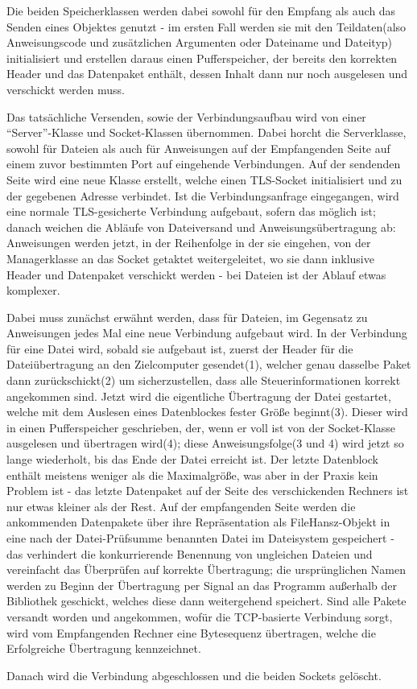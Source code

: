 Die beiden Speicherklassen werden dabei sowohl für den Empfang als auch das Senden eines Objektes genutzt - im ersten Fall werden sie mit den Teildaten(also Anweisungscode und zusätzlichen Argumenten oder Dateiname und Dateityp)
 initialisiert und erstellen daraus einen Pufferspeicher, der bereits den korrekten Header und das Datenpaket enthält, dessen Inhalt dann nur noch ausgelesen und verschickt werden muss.\par
Das tatsächliche Versenden, sowie der Verbindungsaufbau wird von einer "`Server"'-Klasse und Socket-Klassen übernommen.
Dabei horcht die Serverklasse, sowohl für Dateien als auch für Anweisungen auf der Empfangenden Seite auf einem zuvor bestimmten Port auf eingehende Verbindungen.
Auf der sendenden Seite wird eine neue Klasse erstellt, welche einen TLS-Socket initialisiert und zu der gegebenen Adresse verbindet.
Ist die Verbindungsanfrage eingegangen, wird eine normale TLS-gesicherte Verbindung aufgebaut, sofern das möglich ist; danach weichen die Abläufe von Dateiversand und Anweisungsübertragung ab: Anweisungen werden jetzt, in der Reihenfolge in der sie eingehen, von der Managerklasse an das Socket getaktet weitergeleitet, wo sie dann inklusive Header und Datenpaket verschickt werden - bei Dateien ist der Ablauf etwas komplexer.\par
Dabei muss zunächst erwähnt werden, dass für Dateien, im Gegensatz zu Anweisungen jedes Mal eine neue Verbindung aufgebaut wird.
In der Verbindung für eine Datei wird, sobald sie aufgebaut ist, zuerst der Header für die Dateiübertragung an den Zielcomputer gesendet(1), welcher genau dasselbe Paket dann zurückschickt(2) um sicherzustellen, dass alle Steuerinformationen korrekt angekommen sind.
Jetzt wird die eigentliche Übertragung der Datei gestartet, welche mit dem Auslesen eines Datenblockes fester Größe beginnt(3).
Dieser wird in einen Pufferspeicher geschrieben, der, wenn er voll ist von der Socket-Klasse ausgelesen und übertragen wird(4); diese Anweisungsfolge(3 und 4) wird jetzt so lange wiederholt, bis das Ende der Datei erreicht ist.
Der letzte Datenblock enthält meistens weniger als die Maximalgröße, was aber in der Praxis kein Problem ist - das letzte Datenpaket auf der Seite des verschickenden Rechners ist nur etwas kleiner als der Rest.
Auf der empfangenden Seite werden die ankommenden Datenpakete über ihre Repräsentation als FileHansz-Objekt in eine nach der Datei-Prüfsumme benannten Datei im Dateisystem gespeichert - das verhindert die konkurrierende Benennung von ungleichen Dateien und vereinfacht das Überprüfen auf korrekte Übertragung; die ursprünglichen Namen werden zu Beginn der Übertragung per Signal an das Programm außerhalb der Bibliothek geschickt, welches diese dann weitergehend speichert.
Sind alle Pakete versandt worden und angekommen, wofür die TCP-basierte Verbindung sorgt, wird vom Empfangenden Rechner eine Bytesequenz übertragen, welche die Erfolgreiche Übertragung kennzeichnet.\par
Danach wird die Verbindung abgeschlossen und die beiden Sockets gelöscht.\\
%